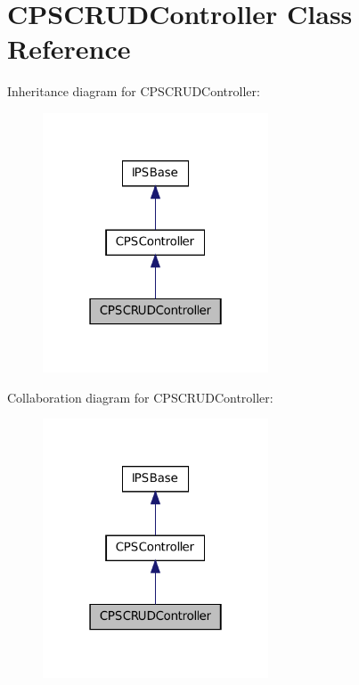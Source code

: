 \hypertarget{classCPSCRUDController}{
\section{CPSCRUDController Class Reference}
\label{classCPSCRUDController}
}


Inheritance diagram for CPSCRUDController:\nopagebreak
\begin{figure}[H]
\begin{center}
\leavevmode
\includegraphics[width=190pt]{classCPSCRUDController__inherit__graph}
\end{center}
\end{figure}


Collaboration diagram for CPSCRUDController:\nopagebreak
\begin{figure}[H]
\begin{center}
\leavevmode
\includegraphics[width=190pt]{classCPSCRUDController__coll__graph}
\end{center}
\end{figure}
